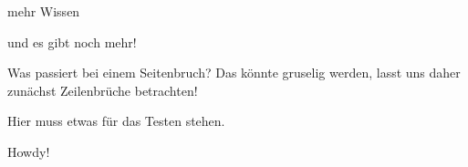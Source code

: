 mehr Wissen


und es gibt noch mehr!










\newpage



Was passiert bei einem Seitenbruch? Das könnte gruselig werden, lasst uns daher zunächst Zeilenbrüche betrachten!


















Hier muss etwas für das Testen stehen.










Howdy!